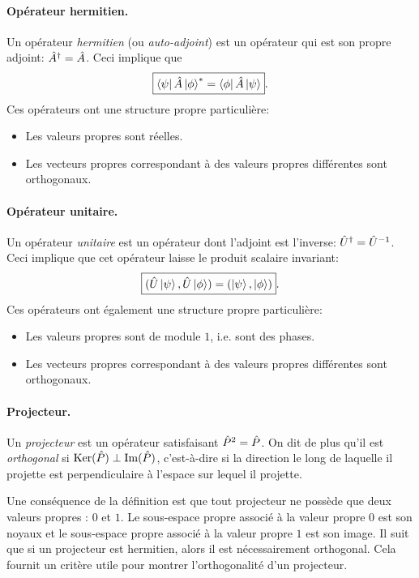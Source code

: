 \documentclass[11pt,a4paper,oneside]{article}
\begin{document}
\paragraph{Opérateur hermitien.} Un opérateur \emph{hermitien} (ou \emph{auto-adjoint}) est un opérateur qui est son propre adjoint: $\hat{A}^\dagger=\hat{A}$. Ceci implique que
\begin{equation}
    \boxed{\bra{\psi}\hat{A}\ket{\phi}^* = \bra{\phi}\hat{A}\ket{\psi}}.
\end{equation}
Ces opérateurs ont une structure propre particulière:
\begin{itemize}[label=\tb]
    \item Les valeurs propres sont réelles.
    \item Les vecteurs propres correspondant à des valeurs propres différentes sont orthogonaux.
\end{itemize}

\paragraph{Opérateur unitaire.} Un opérateur \emph{unitaire} est un opérateur dont l'adjoint est l'inverse: $\hat{U}^\dagger=\hat{U}^{-1}$. Ceci implique que cet opérateur laisse le produit scalaire invariant:
\begin{equation}
    \boxed{(\hat{U}\ket{\psi_{}},\hat{U}\ket{\phi})=(\ket{\psi_{}},\ket{\phi})}.
\end{equation}
Ces opérateurs ont également une structure propre particulière:
\begin{itemize}[label=\tb]
    \item Les valeurs propres sont de module $1$, i.e. sont des phases.
    \item Les vecteurs propres correspondant à des valeurs propres différentes sont orthogonaux.
\end{itemize}

\paragraph{Projecteur.} Un \emph{projecteur} est un opérateur satisfaisant $\hat{P}^2=\hat{P}$. On dit de plus qu'il est \emph{orthogonal} si $\text{Ker}(\hat{P})\perp\Im(\hat{P})$, c'est-à-dire si la direction le long de laquelle il projette est perpendiculaire à l'espace sur lequel il projette. 

Une conséquence de la définition est que tout projecteur ne possède que deux valeurs propres : $0$ et $1$. Le sous-espace propre associé à la valeur propre $0$ est son noyaux et le sous-espace propre associé à la valeur propre $1$ est son image. Il suit que si un projecteur est hermitien, alors il est nécessairement orthogonal. Cela fournit un critère utile pour montrer l'orthogonalité d'un projecteur.
\end{document}
